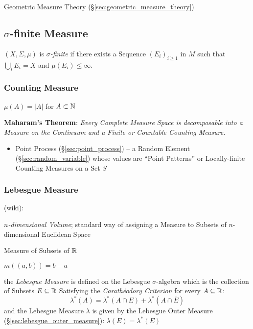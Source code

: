 \fist Geometric Measure Theory (\S\ref{sec:geometric_measure_theory})



\subsection{$\sigma$-finite Measure}\label{sec:sigma_finite}

$(X,\Sigma,\mu)$ is \emph{$\sigma$-finite} if there exists a Sequence
$(E_i)_{i \geq 1}$ in $M$ such that $\bigcup_{i} E_i = X$ and
$\mu(E_i) \leq \infty$.



\subsubsection{Counting Measure}\label{sec:counting_measure}

$\mu(A) = |A|$ for $A \subset \mathbb{N}$

\textbf{Maharam's Theorem}: \emph{
  Every Complete Measure Space is decomposable into a Measure on the Continuum
  and a Finite or Countable Counting Measure.
}

\begin{itemize}
  \item Point Process (\S\ref{sec:point_process}) -- a Random Element
    (\S\ref{sec:random_variable}) whose values are ``Point Patterns'' or
    Locally-finite Counting Measures on a Set $S$
\end{itemize}



\subsubsection{Lebesgue Measure}\label{sec:lebesgue_measure}

(wiki):

\emph{$n$-dimensional Volume}; standard way of assigning a Measure to Subsets of
$n$-dimensional Euclidean Space

Measure of Subsets of $\mathbb{R}$

$m((a,b)) = b - a$

the \emph{Lebesgue Measure} is defined on the Lebesgue $\sigma$-algebra which is
the collection of Subsets $E \subseteq \mathbb{R}$ Satisfying the
\emph{Carath\'eodory Criterion} for every $A \subseteq \mathbb{R}$:
\[
  \lambda^*(A) = \lambda^*(A \cap E) + \lambda^*(A \cap \bar{E})
\]
and the Lebesgue Measure $\lambda$ is given by the Lebesgue Outer Measure
(\S\ref{sec:lebesgue_outer_measure}): $\lambda(E) = \lambda^*(E)$

